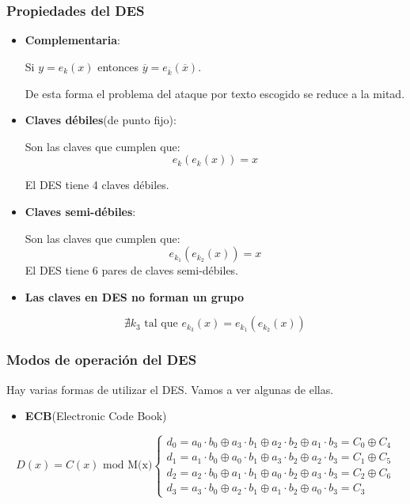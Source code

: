  \subsubsection{Propiedades del DES}
 \begin{itemize}
 	
 
 \item \textbf{Complementaria}: 
 
 Si $y = e_k(x)$ entonces $\overline{y} = e_{\overline{k}}(\overline{x})$.
 
 De esta forma el problema del ataque por texto escogido se reduce a la mitad.
 
 \item \textbf{Claves débiles}(de punto fijo):
 
  Son las claves que cumplen que: $$e_k(e_k(x))= x$$
 
 El DES tiene 4 claves débiles.
 
 \item \textbf{Claves semi-débiles}: 
 
 Son las claves que cumplen que: $$e_{k_1}(e_{k_2}(x)) = x$$
 El DES tiene 6 pares de claves semi-débiles.
 
 \item \textbf{Las claves en DES no forman un grupo}
 
 $$\nexists k_3 \text{ tal que } e_{k_3}(x) = e_{k_1}(e_{k_2}(x))$$
 
\end{itemize}

\subsubsection{Modos de operación del DES}

Hay varias formas de utilizar el DES. Vamos a ver algunas de ellas.

\begin{itemize}
	\item \textbf{ECB}(Electronic Code Book)
	
\end{itemize}
 
 $$D(x) = C(x) \text{ mod M(x)} \begin{cases}
 d_0 = a_0\cdot b_0 \oplus a_3 \cdot b_1 \oplus a_2 \cdot b_2 \oplus a_1 \cdot b_3 = C_0 \oplus C_4\\
 d_1 = a_1\cdot b_0 \oplus a_0 \cdot b_1 \oplus a_3 \cdot b_2 \oplus a_2 \cdot b_3 = C_1 \oplus C_5\\
 d_2 = a_2\cdot b_0 \oplus a_1 \cdot b_1 \oplus a_0 \cdot b_2 \oplus a_3 \cdot b_3 = C_2 \oplus C_6\\
 d_3 = a_3\cdot b_0 \oplus a_2 \cdot b_1 \oplus a_1 \cdot b_2 \oplus a_0 \cdot b_3 = C_3
 \end{cases}$$
 
